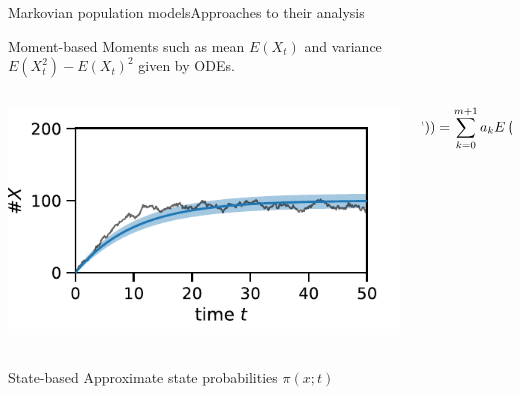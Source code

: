 \documentclass[9pt]{beamer}
\newcommand{\expSym}{{E}}
\newcommand{\E}[1]{\ensuremath{\expSym\left(#1\right)}}
\begin{document}
\begin{frame}{Markovian population models}{Approaches to their analysis}
          \begin{block}{Moment-based}
              Moments such as mean $\E{X_t}$ and variance $\E{X_t^2}-\E{X_t}^2$ given by ODEs.
              \vspace{1em}
              \begin{columns}
                  \begin{column}{.4\textwidth}
                      \centering
    \includegraphics[width=\textwidth]{../gfx/momsandsims.pdf}
                  \end{column}
                  \begin{column}{.45\textwidth}
                      \vspace{-2em}
                      \[
                      \hspace{-4em}
            \frac{d}{dt}\E{{{ X}}_t^m)} = \sum_{k=0}^{m+1} a_k \E{X^k}
        \]
                  \end{column}
              \end{columns}
          \end{block}
          \begin{block}{State-based}
              Approximate state probabilities $\pi(x;t)$
              \vspace{1em}
              \begin{columns}

\end{columns}
\end{block}
\end{frame}
\end{document}
